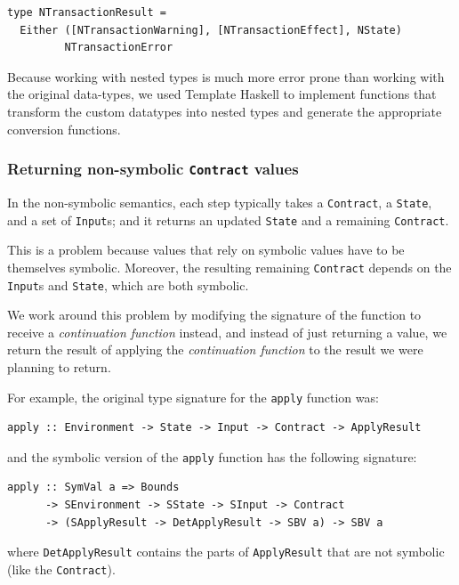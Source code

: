 \documentclass[runningheads]{llncs}
\begin{document}
\begin{verbatim}
type NTransactionResult =
  Either ([NTransactionWarning], [NTransactionEffect], NState)
         NTransactionError
\end{verbatim}

\noindent
Because working with nested types is much more error prone than working with the original data-types, we used Template Haskell \cite{sheard2002template} to implement functions that transform the custom datatypes into nested types and generate the appropriate conversion functions.

\subsubsection{Returning non-symbolic \texttt{Contract} values}

In the non-symbolic semantics, each step typically takes a \texttt{Contract}, a \texttt{State}, and a set of \texttt{Input}s; and it returns an updated \texttt{State} and a remaining \texttt{Contract}.

This is a problem because values that rely on symbolic values have to be themselves symbolic. Moreover,  the resulting remaining \texttt{Contract} depends on the \texttt{Input}s and \texttt{State}, which are both symbolic.

We work around this problem by  modifying the signature of the function to receive a \textit{continuation function} instead, and instead of just returning a value, we return the result of applying the \textit{continuation function} to the result we were planning to return.

For example, the original type signature for the \texttt{apply} function was:

\begin{verbatim}
apply :: Environment -> State -> Input -> Contract -> ApplyResult
\end{verbatim}

\noindent
and the symbolic version of the \texttt{apply} function has the following signature:

\begin{verbatim}
apply :: SymVal a => Bounds
      -> SEnvironment -> SState -> SInput -> Contract
      -> (SApplyResult -> DetApplyResult -> SBV a) -> SBV a
\end{verbatim}

\noindent
where \texttt{DetApplyResult} contains the parts of \texttt{ApplyResult} that are not symbolic (like the \texttt{Contract}).
\end{document}
